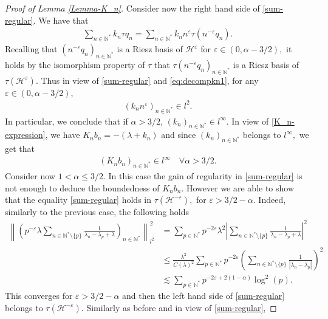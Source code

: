 \documentclass[10pt,a4paper]{amsart}
\begin{document}
\begin{proof}[Proof of Lemma \ref{Lemma-K_n}]
Consider now the right hand side of \eqref{sum-regular}. We have that
\begin{align}
\label{eq:decompkn1}
   \sum_{n\in \mathbb{N}^*}k_{n}\tau q_{n}=\sum_{n\in \mathbb{N}^*}k_{n}n^{\varepsilon}\tau(n^{-\varepsilon} q_{n}). 
\end{align} 
Recalling that $(n^{-\varepsilon} q_{n})_{n\in \mathbb{N}^*}$ is a Riesz basis of $\mathcal{H}^{\varepsilon}$ for $\varepsilon \in (0,\alpha-3/2),$ it holds by the isomorphism property of $\tau$ that $\tau(n^{-\varepsilon} q_{n})_{n\in \mathbb{N}^*}$ is a Riesz basis of $\tau(\mathcal{H}^{\varepsilon}).$ Thus in view of \eqref{sum-regular} and \eqref{eq:decompkn1}, 
for any $\varepsilon \in (0,\alpha-3/2),$
\begin{align*}
    (k_n n^{\varepsilon})_{n\in \mathbb{N}^*}\in l^2.
\end{align*} 
In particular, we conclude that if $\alpha>3/2$, $(k_n)_{n\in \mathbb{N}^*}\in l^{\infty}.$
In view of \eqref{K_n-expression}, we have $K_n b_n=-(\lambda+k_n)$ and since $(k_n)_{n\in \mathbb{N}^*}$ belongs to $l^{\infty},$ we get that 
\begin{align}
    (K_n b_n)_{n\in \mathbb{N}^*}\in l^{\infty}\quad  \forall \alpha>3/2.\label{Kn-l-infty1}
\end{align} 
Consider now $1<\alpha\leq 3/2.$ In this case the gain of regularity in \eqref{sum-regular} is not enough to deduce the boundedness of $K_n b_n.$ However we are able to show that the equality \eqref{sum-regular} holds in $\tau(\mathcal{H}^{-\varepsilon}),$ for $\varepsilon>3/2-\alpha.$ Indeed, similarly to the previous case, the following holds
\begin{align*}
    \left\|\left(p^{-\varepsilon}\lambda\displaystyle\sum_{n\in \mathbb{N}^*\setminus\{p\}}\frac{1}{\lambda_n-\lambda_p+\lambda}\right)_{n\in \mathbb{N}^*}\right\|^2_{l^2}&=\sum_{p\in \mathbb{N}^*}p^{-2\varepsilon}\lambda^2\left|\displaystyle\sum_{n\in \mathbb{N}^*\setminus\{p\}}\frac{1}{\lambda_n-\lambda_p+\lambda}\right|^2\\
    &\leq \frac{\lambda^2}{C(\lambda)^2}\sum_{p\in \mathbb{N}^*}p^{-2\varepsilon}\left(\displaystyle\sum_{n\in \mathbb{N}^*\setminus\{p\}}\frac{1}{|\lambda_n-\lambda_p|}\right)^2\\
    &\lesssim\sum_{p\in \mathbb{N}^*} p^{-2\varepsilon+2(1-\alpha)}\log^2(p).
\end{align*} This converges for $\varepsilon>3/2-\alpha$ and then the left hand side of \eqref{sum-regular} belongs to $\tau(\mathcal{H}^{-\varepsilon}).$ 
Similarly as before and in view of \eqref{sum-regular}, 

\end{proof}
\end{document}
